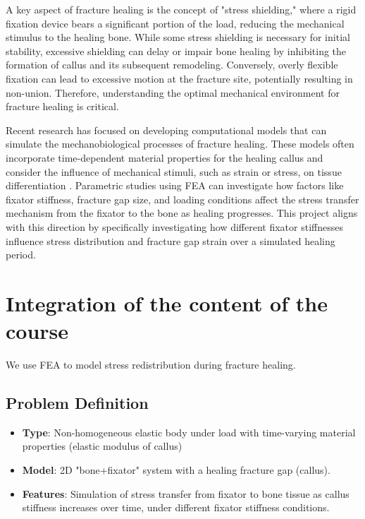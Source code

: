 \documentclass{article}
\begin{document}
A key aspect of fracture healing is the concept of "stress shielding," where a rigid fixation device bears a significant portion of the load, reducing the mechanical stimulus to the healing bone. While some stress shielding is necessary for initial stability, excessive shielding can delay or impair bone healing by inhibiting the formation of callus and its subsequent remodeling. Conversely, overly flexible fixation can lead to excessive motion at the fracture site, potentially resulting in non-union. Therefore, understanding the optimal mechanical environment for fracture healing is critical.

Recent research has focused on developing computational models that can simulate the mechanobiological processes of fracture healing. These models often incorporate time-dependent material properties for the healing callus and consider the influence of mechanical stimuli, such as strain or stress, on tissue differentiation \citep{morgan2024novel}. Parametric studies using FEA can investigate how factors like fixator stiffness, fracture gap size, and loading conditions affect the stress transfer mechanism from the fixator to the bone as healing progresses. This project aligns with this direction by specifically investigating how different fixator stiffnesses influence stress distribution and fracture gap strain over a simulated healing period.

\section{Integration of the content of the course}

We use FEA to model stress redistribution during fracture healing.

\subsection{Problem Definition}

\begin{itemize}
  \item \textbf{Type}: Non-homogeneous elastic body under load with time-varying material properties (elastic modulus of callus)
  \item \textbf{Model}: 2D "bone+fixator" system with a healing fracture gap (callus).
  \item \textbf{Features}: Simulation of stress transfer from fixator to bone tissue as callus stiffness increases over time, under different fixator stiffness conditions.
\end{itemize}
\end{document}
